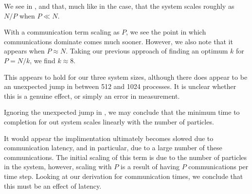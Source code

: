 \begin{figure}[!h]
    
    \caption{}
    \label{fig:v0_systolic_pair_operation_4096_logtime}
\end  {figure}

\begin{figure}[!h]
    
    \caption{}
    \label{fig:v0_systolic_pair_operation_32768_logtime}
\end  {figure}

\vZeroTimeExplanation
{}
{}
{}
{\pairoperation{}}
{\systolicloop{}}

We see in 
,
 and
that, much like in the \replicateddata{} case, that the system scales
roughly as $N/P$ when $P \ll{} N$.

With a communication term scaling as $P$, we see the point in which
communications dominate comes much sooner.
%
However, we also note that it appears when $P \approx{} N$.
%
Taking our previous approach of finding an optimum $k$ for $P = N/k$,
we find $k \approx{} 8$.

This appears to hold for our three system sizes, although there does appear
to be an unexpected jump in
between 512 and 1024 processes.
%
It is unclear whether this is a genuine effect, or simply an error in
measurement.

Ignoring the unexpected jump in 
,
we may conclude that the minimum time to completion for out system
scales linearly with the number of particles.

It would appear the implimentation ultimately becomes slowed due to
communication latency, and in particular, due to a large number
of these communications.
%
The initial scaling of this term is due to the number of particles
in the system, however,
scaling with $P$ is a result of having $P$ communications
per time step.
%
Looking at our derivation for communication times,
we conclude that this must be an effect of latency.
